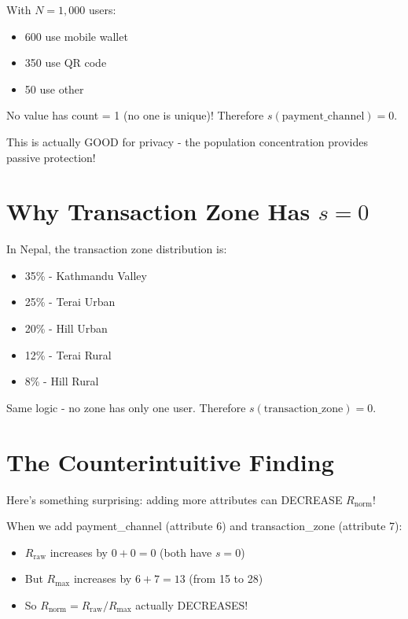 \documentclass[12pt,a4paper,oneside,openany]{report}
\begin{document}
With $N = 1,000$ users:
\begin{itemize}
    \item 600 use mobile wallet
    \item 350 use QR code
    \item 50 use other
\end{itemize}

No value has count = 1 (no one is unique)! Therefore $s(\text{payment\_channel}) = 0$.

This is actually GOOD for privacy - the population concentration provides passive protection!

\section{Why Transaction Zone Has $s = 0$}
\label{sec:nepal_zone}

In Nepal, the transaction zone distribution is:
\begin{itemize}
    \item 35\% - Kathmandu Valley
    \item 25\% - Terai Urban
    \item 20\% - Hill Urban
    \item 12\% - Terai Rural
    \item 8\% - Hill Rural
\end{itemize}

Same logic - no zone has only one user. Therefore $s(\text{transaction\_zone}) = 0$.

\section{The Counterintuitive Finding}
\label{sec:nepal_counterintuitive}

Here's something surprising: adding more attributes can DECREASE $R_{\mathrm{norm}}$!

When we add payment\_channel (attribute 6) and transaction\_zone (attribute 7):
\begin{itemize}
    \item $R_{\mathrm{raw}}$ increases by $0 + 0 = 0$ (both have $s = 0$)
    \item But $R_{\mathrm{max}}$ increases by $6 + 7 = 13$ (from 15 to 28)
    \item So $R_{\mathrm{norm}} = R_{\mathrm{raw}} / R_{\mathrm{max}}$ actually DECREASES!
\end{itemize}
\end{document}
